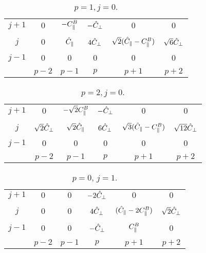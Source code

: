 \documentclass{article}
\begin{document}
    \begin{table}[h]
        \centering
        \begin{tabular}{c|ccccc}
            $j+1$ & $0$ & $-C_{\parallel}^{B}$ & $-\hat C_{\perp}$ & $0$ & $0$ \\
            & & & & & \\
            $j$   & $0$ & $\hat C_{\parallel}$ & $4\hat C_{\perp}$ & $\sqrt{2}(\hat C_{\parallel} - C_{\parallel}^{B})$ & $\sqrt{6}\hat C_{\perp}$ \\
            & & & & & \\
            $j-1 $& $0$ & $0$ & $0$ & $0$ & $0$ \\
            & & & & & \\
            \hline
                  & $p-2$ & $p-1$ & $p$ & $p+1$ & $p+2$
            \end{tabular}
        \caption{$p=1, j=0$.}
    \end{table}
    
    \begin{table}[h]
        \centering
        \begin{tabular}{c|ccccc}
        $j+1$ & $0$ & $-\sqrt{2}C_{\parallel}^{B}$ & $-\hat C_{\perp}$ & $0$ & $0$ \\
        & & & & & \\
        $j$   & $\sqrt{2}\hat C_{\perp}$ & $\sqrt{2}\hat C_{\parallel}$ & $6\hat C_{\perp}$ & $\sqrt{3}(\hat C_{\parallel} - C_{\parallel}^{B})$ & $\sqrt{12}\hat C_{\perp}$ \\
        & & & & & \\
        $j-1 $& $0$ & $0$ & $0$ & $0$ & $0$ \\
        & & & & & \\
        \hline
              & $p-2$ & $p-1$ & $p$ & $p+1$ & $p+2$
        \end{tabular}
        \caption{$p=2, j=0$.}
    \end{table}
    
    \begin{table}[h]
        \centering
        \begin{tabular}{c|ccccc}
        $j+1$ & $0$ & $0$ & $-2\hat C_{\perp}$ & $0$ & $0$ \\
        & & & & & \\
        $j$   & $0$ & $0$ & $4\hat C_{\perp}$ & $(\hat C_{\parallel} - 2C_{\parallel}^{B})$ & $\sqrt{2}\hat C_{\perp}$ \\
        & & & & & \\
        $j-1 $& $0$ & $0$ & $-\hat C_{\perp}$ & $C_{\parallel}^{B}$ & $0$ \\
        & & & & & \\
        \hline
              & $p-2$ & $p-1$ & $p$ & $p+1$ & $p+2$
        \end{tabular}
        \caption{$p=0$, $j=1$.}
    \end{table}
\end{document}
